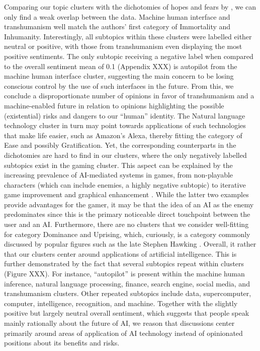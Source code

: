 Comparing our topic clusters with the dichotomies of hopes and fears by \citet{cave2019}, we can only find a weak overlap between the data. Machine human interface and transhumanism well match the authors’ first category of Immortality and Inhumanity. Interestingly, all subtopics within these clusters were labelled either neutral or positive, with those from transhumanism even displaying the most positive sentiments. The only subtopic receiving a negative label when compared to the overall sentiment mean of 0.1 (Appendix XXX) is autopilot from the machine human interface cluster, suggesting the main concern to be losing conscious control by the use of such interfaces in the future. From this, we conclude a disproportionate number of opinions in favor of transhumanism and a machine-enabled future in relation to opinions highlighting the possible (existential) risks and dangers to our “human” identity. The Natural language technology cluster in turn may point towards applications of such technologies that make life easier, such as Amazon’s Alexa, thereby fitting the category of Ease and possibly Gratification. Yet, the corresponding counterparts in the dichotomies are hard to find in our clusters, where the only negatively labelled subtopics exist in the gaming cluster. This aspect can be explained by the increasing prevalence of AI-mediated systems in games, from non-playable characters (which can include enemies, a highly negative subtopic) to iterative game improvement and graphical enhancement \citep{anandrise}. While the latter two examples provide advantages for the gamer, it may be that the idea of an AI as the enemy predominates since this is the primary noticeable direct touchpoint between the user and an AI. 
Furthermore, there are no clusters that we consider well-fitting for \citet{cave2019} category Dominance and Uprising, which, curiously, is a category commonly discussed by popular figures such as the late Stephen Hawking \citep{hawking2014transcendence}. Overall, it rather that our clusters center around applications of artificial intelligence. This is further demonstrated by the fact that several subtopics repeat within clusters (Figure XXX). For instance, “autopilot” is present within the machine human inference, natural language processing, finance, search engine, social media, and transhumanism clusters. Other repeated subtopics include data, supercomputer, computer, intelligence, recognition, and machine. Together with the slightly positive but largely neutral overall sentiment, which suggests that people speak mainly rationally about the future of AI, we reason that discussions center primarily around areas of application of AI technology instead of opinionated positions about its benefits and risks. 

